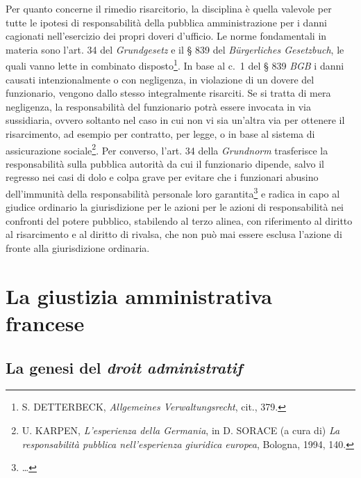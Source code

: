 \documentclass[12pt,it,a4paper,]{report}
\begin{document}
Per quanto concerne il rimedio risarcitorio, la disciplina è quella
valevole per tutte le ipotesi di responsabilità della pubblica
amministrazione per i danni cagionati nell'esercizio dei propri doveri
d'ufficio. Le norme fondamentali in materia sono l'art. 34 del
\emph{Grundgesetz} e il § 839 del \emph{Bürgerliches Gesetzbuch}, le
quali vanno lette in combinato disposto\footnote{S. DETTERBECK,
  \emph{Allgemeines Verwaltungsrecht}, cit., 379.}. In base al c.~1 del
§ 839 \emph{BGB} i danni causati intenzionalmente o con negligenza, in
violazione di un dovere del funzionario, vengono dallo stesso
integralmente risarciti. Se si tratta di mera negligenza, la
responsabilità del funzionario potrà essere invocata in via sussidiaria,
ovvero soltanto nel caso in cui non vi sia un'altra via per ottenere il
risarcimento, ad esempio per contratto, per legge, o in base al sistema
di assicurazione sociale\footnote{U. KARPEN, \emph{L'esperienza della
  Germania}, in D. SORACE (a cura di) \emph{La responsabilità pubblica
  nell'esperienza giuridica europea}, Bologna, 1994, 140.}. Per
converso, l'art. 34 della \emph{Grundnorm} trasferisce la responsabilità
sulla pubblica autorità da cui il funzionario dipende, salvo il regresso
nei casi di dolo e colpa grave per evitare che i funzionari abusino
dell'immunità della responsabilità personale loro garantita\footnote{\ldots{}}
e radica in capo al giudice ordinario la giurisdizione per le azioni per
le azioni di responsabilità nei confronti del potere pubblico,
stabilendo al terzo alinea, con riferimento al diritto al risarcimento e
al diritto di rivalsa, che non può mai essere esclusa l'azione di fronte
alla giurisdizione ordinaria.

\hypertarget{la-giustizia-amministrativa-francese}{%
\chapter{La giustizia amministrativa
francese}\label{la-giustizia-amministrativa-francese}}

\hypertarget{la-genesi-del-droit-administratif}{%
\section{\texorpdfstring{La genesi del \emph{droit
administratif}}{La genesi del droit administratif}}\label{la-genesi-del-droit-administratif}}
\end{document}
